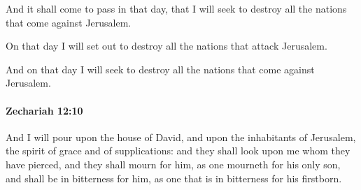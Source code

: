			\begin{versebox}
					\item[BHS] 
					\item[LXX] 
					\item[ASV] And it shall come to pass in that day, that I will seek to destroy all the nations that come against Jerusalem.
					\item[NIV] On that day I will set out to destroy all the nations that attack Jerusalem.
					\item[NRSV] And on that day I will seek to destroy all the nations that come against Jerusalem.
			\end{versebox}

		\paragraph{Zechariah 12:10} %
			\label{ZECHARIAH-12-10}

			And I will pour upon the house of David, and upon the inhabitants of Jerusalem, the spirit of grace and of supplications: and they shall look upon me whom they have pierced, and they shall mourn for him, as one mourneth for his only son, and shall be in bitterness for him, as one that is in bitterness for his firstborn.

